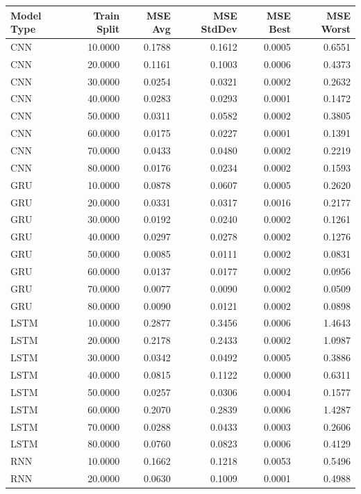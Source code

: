 \begin{tabular}{lrrrrr}
\toprule
Model Type & Train Split & MSE Avg & MSE StdDev & MSE Best & MSE Worst \\
\midrule
CNN & 10.0000 & 0.1788 & 0.1612 & 0.0005 & 0.6551 \\
CNN & 20.0000 & 0.1161 & 0.1003 & 0.0006 & 0.4373 \\
CNN & 30.0000 & 0.0254 & 0.0321 & 0.0002 & 0.2632 \\
CNN & 40.0000 & 0.0283 & 0.0293 & 0.0001 & 0.1472 \\
CNN & 50.0000 & 0.0311 & 0.0582 & 0.0002 & 0.3805 \\
CNN & 60.0000 & 0.0175 & 0.0227 & 0.0001 & 0.1391 \\
CNN & 70.0000 & 0.0433 & 0.0480 & 0.0002 & 0.2219 \\
CNN & 80.0000 & 0.0176 & 0.0234 & 0.0002 & 0.1593 \\
GRU & 10.0000 & 0.0878 & 0.0607 & 0.0005 & 0.2620 \\
GRU & 20.0000 & 0.0331 & 0.0317 & 0.0016 & 0.2177 \\
GRU & 30.0000 & 0.0192 & 0.0240 & 0.0002 & 0.1261 \\
GRU & 40.0000 & 0.0297 & 0.0278 & 0.0002 & 0.1276 \\
GRU & 50.0000 & 0.0085 & 0.0111 & 0.0002 & 0.0831 \\
GRU & 60.0000 & 0.0137 & 0.0177 & 0.0002 & 0.0956 \\
GRU & 70.0000 & 0.0077 & 0.0090 & 0.0002 & 0.0509 \\
GRU & 80.0000 & 0.0090 & 0.0121 & 0.0002 & 0.0898 \\
LSTM & 10.0000 & 0.2877 & 0.3456 & 0.0006 & 1.4643 \\
LSTM & 20.0000 & 0.2178 & 0.2433 & 0.0002 & 1.0987 \\
LSTM & 30.0000 & 0.0342 & 0.0492 & 0.0005 & 0.3886 \\
LSTM & 40.0000 & 0.0815 & 0.1122 & 0.0000 & 0.6311 \\
LSTM & 50.0000 & 0.0257 & 0.0306 & 0.0004 & 0.1577 \\
LSTM & 60.0000 & 0.2070 & 0.2839 & 0.0006 & 1.4287 \\
LSTM & 70.0000 & 0.0288 & 0.0433 & 0.0003 & 0.2606 \\
LSTM & 80.0000 & 0.0760 & 0.0823 & 0.0006 & 0.4129 \\
RNN & 10.0000 & 0.1662 & 0.1218 & 0.0053 & 0.5496 \\
RNN & 20.0000 & 0.0630 & 0.1009 & 0.0001 & 0.4988 \\

\end{tabular}
